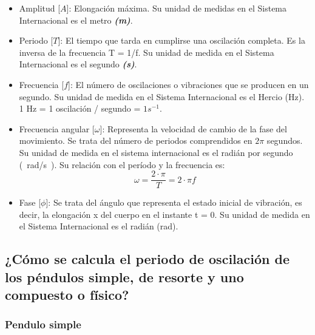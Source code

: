 \documentclass[twocolumn, 12pt]{article}
\newcommand{\bolditalic}[1]{\textbf{\textit{#1}}}
\begin{document}
\begin{itemize}[label=$\triangleright$]
    \item Amplitud [{\large $A$}]: Elongación máxima. Su unidad de
          medidas en el Sistema Internacional es el metro
          \bolditalic{(m)}.

    \item Periodo [{\large $T$}]: El tiempo que tarda en cumplirse
          una oscilación completa. Es la inversa de la frecuencia T =
          1/f. Su unidad de medida en el Sistema Internacional es el
          segundo \bolditalic{(s)}.

    \item Frecuencia [{\large $f$}]: El número de oscilaciones o
          vibraciones que se producen en un segundo. Su unidad de
          medida en el Sistema Internacional es el Hercio (Hz). 1 Hz
          = 1 oscilación / segundo = $1 s^{-1}$.

    \item Frecuencia angular [{\large $\omega$}]: Representa la
          velocidad de cambio de la fase del movimiento. Se trata del
          número de periodos comprendidos en $2\pi$ segundos. Su
          unidad de medida en el sistema internacional es el radián
          por segundo (\@~rad/s\@~). Su relación con el período y la
          frecuencia es: {\large
          \begin{equation}
              \omega = \frac{2 \cdot \pi}{T} = 2 \cdot \pi f
          \end{equation}
          }

    \item Fase [{\large $\phi$}]: Se trata del ángulo que representa
          el estado inicial de vibración, es decir, la elongación x
          del cuerpo en el instante t = 0. Su unidad de medida en el
          Sistema Internacional es el radián (rad).
\end{itemize}

\nocite{movimiento-armonico-simple}

\subsection{¿Cómo se calcula el periodo de oscilación de los péndulos simple, de resorte y uno compuesto
    o físico?}

\subsubsection{Pendulo simple}
\end{document}
